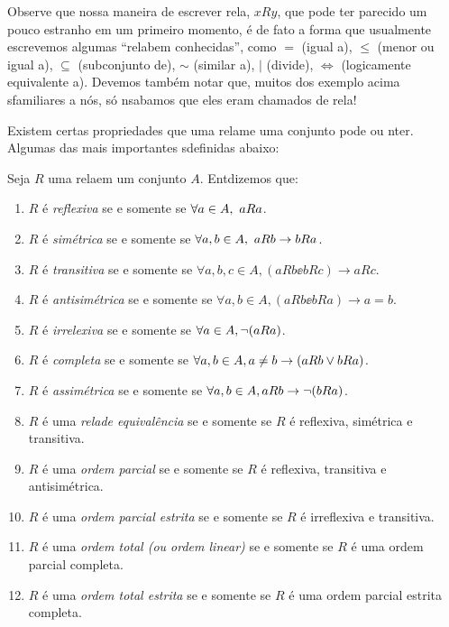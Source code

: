 Observe que nossa maneira de escrever rela\cois, $xRy$, que pode ter parecido um pouco estranho em um primeiro momento, \'e de fato a forma que usualmente escrevemos algumas ``rela\coes bem conhecidas'', como $=$ (igual a), $\leq$ (menor ou igual a), $\subseteq$ (subconjunto de), $\sim$ (similar a), $|$ (divide), $\Leftrightarrow$ (logicamente equivalente a). Devemos tamb\'em notar que, muitos dos exemplo acima s\ao familiares a n\'os, s\'o n\ao sab\ih amos que eles eram chamados de rela\cois!

Existem certas propriedades que uma rela\cao me uma conjunto pode ou n\ao ter. Algumas das mais importantes s\ao definidas abaixo:
\begin{definb}\label{reldef1}
Seja $R$ uma rela\cao em um conjunto $A$. Ent\ao dizemos que:
\begin{enumerate}[{\bf a)}]
\item $R$ \'e {\it reflexiva} se e somente se $\forall a\in A,\textrm{ } aRa$.
\item $R$ \'e {\it sim\'etrica} se e somente se $\forall a,b\in A,\textrm{ } aRb\to bRa$.
\item $R$ \'e {\it transitiva} se e somente se $\forall a,b,c\in A, (aRb\ee bRc)\to aRc$.
\item $R$ \'e {\it antisim\'etrica} se e somente se $\forall a,b\in A, (aRb\ee bRa)\to a=b$.
\item $R$ \'e {\it irrelexiva} se e somente se $\forall a\in A, \lnot(aRa)$.
\item $R$ \'e {\it completa} se e somente se $\forall a,b\in A, a\neq b \to (aRb\vee bRa)$.
\item $R$ \'e {\it assim\'etrica} se e somente se $\forall a,b\in A, aRb\to\lnot(bRa)$.
\item $R$ \'e uma {\it rela\cao de equival\^encia} se e somente se $R$ \'e reflexiva, sim\'etrica e transitiva.
\item $R$ \'e uma {\it ordem parcial} se e somente se $R$ \'e reflexiva, transitiva e antisim\'etrica. 
\item $R$ \'e uma {\it ordem parcial estrita} se e somente se $R$ \'e irreflexiva e transitiva.
\item $R$ \'e uma {\it ordem total (ou ordem linear)} se e somente se $R$ \'e uma ordem parcial completa.
\item $R$ \'e uma {\it ordem total estrita } se e somente se $R$ \'e uma ordem parcial estrita completa.
\end{enumerate}
\end{definb}


